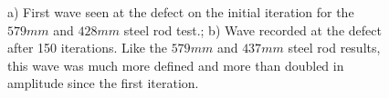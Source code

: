   \begin{figure}
 \begin{subfigmatrix}{2}
 \end{subfigmatrix}
 
    \caption
    { \label{fig:steelExp2}
    a) First wave seen at the defect on the initial iteration for the $579 mm$ and $428 mm$ steel rod test.; b) Wave recorded at the defect after 150 iterations. Like the $579 mm$ and $437 mm$ steel rod results, this wave was much more defined and more than doubled in amplitude since the first iteration.
  }
 \end{figure}
 
